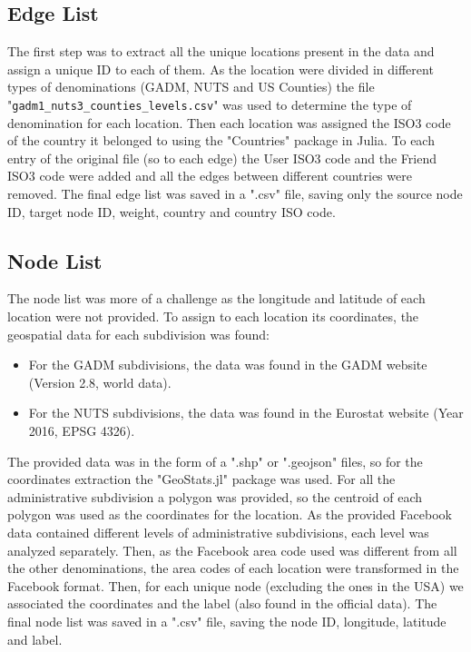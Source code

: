 \subsection{Edge List}
The first step was to extract all the unique locations present in the data and assign a unique ID to each of them. As the location were divided in different types of denominations (GADM\cite{GADM}, NUTS\cite{NUTS} and US Counties) the file "\texttt{gadm1\_nuts3\_counties\_levels.csv}" was used to determine the type of denomination for each location.
Then each location was assigned the ISO3 code of the country it belonged to using the "Countries" package in Julia\cite{countries_package}.
To each entry of the original file (so to each edge) the User ISO3 code and the Friend ISO3 code were added and all the edges between different countries were removed.
The final edge list was saved in a ".csv" file, saving only the source node ID, target node ID, weight, country and country ISO code.

\subsection{Node List}
The node list was more of a challenge as the longitude and latitude of each location were not provided.
To assign to each location its coordinates, the geospatial data for each subdivision was found:
\begin{itemize}
    \item For the GADM subdivisions, the data was found in the GADM website\cite{GADM} (Version 2.8, world data).
    \item For the NUTS subdivisions, the data was found in the Eurostat website\cite{NUTS} (Year 2016, EPSG 4326).
\end{itemize}
The provided data was in the form of a ".shp" or ".geojson" files, so for the coordinates extraction the "GeoStats.jl" package was used\cite{geostats_package}. For all the administrative subdivision a polygon was provided, so the centroid of each polygon was used as the coordinates for the location. As the provided Facebook data contained different levels of administrative subdivisions, each level was analyzed separately.
Then, as the Facebook area code used was different from all the other denominations, the area codes of each location were transformed in the Facebook format.
Then, for each unique node (excluding the ones in the USA) we associated the coordinates and the label (also found in the official data).
The final node list was saved in a ".csv" file, saving the node ID, longitude, latitude and label.

